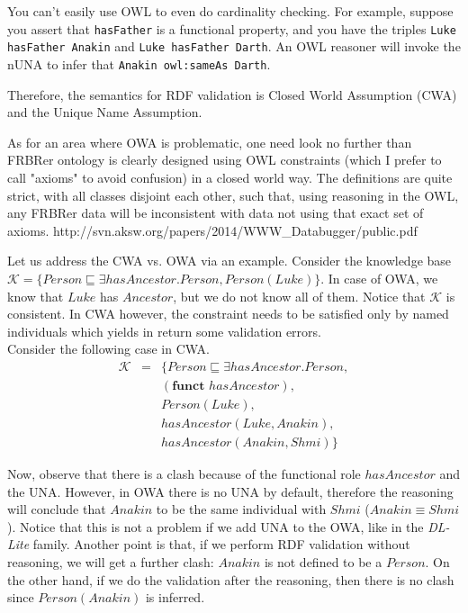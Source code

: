 \documentclass{llncs}
\newcommand{\ms}[1]{\texttt{#1}}
\newcommand{\tb}[1]{\todo[size=\small, color=green!40]{\textbf{Thomas:} #1}}
\begin{document}
You can't easily use OWL to even do cardinality checking. 
For example, suppose you assert that \ms{hasFather} is a functional property, and you have the triples \ms{Luke hasFather Anakin} and \ms{Luke hasFather Darth}.
An OWL reasoner will invoke the nUNA to infer that \ms{Anakin owl:sameAs Darth}.

Therefore, the semantics for RDF validation is Closed World Assumption (CWA) and the Unique Name Assumption.
 
As for an area where OWA is problematic, one need look no further than
FRBRer ontology is clearly designed using OWL constraints
(which I prefer to call "axioms" to avoid confusion) in a closed world
way. The definitions are quite strict, with all classes disjoint each
other, such that, using reasoning in the OWL, any FRBRer data will be
inconsistent with data not using that exact set of axioms. 
http://svn.aksw.org/papers/2014/WWW\_Databugger/public.pdf


Let us address the CWA vs. OWA via an example. Consider the knowledge base  $\mathcal{K} = \{Person \sqsubseteq \exists hasAncestor.Person, Person(Luke)\}$. In case of OWA, we know that $Luke$ has $Ancestor$, but we do not know all of them. Notice that $\mathcal{K}$ is consistent. In CWA however, the constraint needs to be satisfied only by named individuals which yields in return some validation errors.\\
Consider the following case in CWA. 
\begin{eqnarray*}
\mathcal{K} &=  & \{Person \sqsubseteq \exists hasAncestor.Person, \\
 &&(\textbf{funct }  hasAncestor),\\  && Person(Luke),\\ && hasAncestor(Luke, Anakin),\\  && hasAncestor(Anakin, Shmi)\}
\end{eqnarray*}

\noindent Now, observe that there is a clash because of the functional role $hasAncestor$ and the UNA. However, in OWA there is no UNA by default, therefore the reasoning will conclude that  $Anakin$ to be the same individual with $Shmi$ ($Anakin \equiv Shmi$). Notice that this is not a problem if we add UNA to the OWA, like in the \textit{DL-Lite} family.
Another point is that, if we perform RDF validation without reasoning, we will get a further clash: $Anakin$ is not defined to be a $Person$. On the other hand, if we do the validation after the reasoning, then there is no clash since $Person(Anakin)$ is inferred. 
\end{document}
